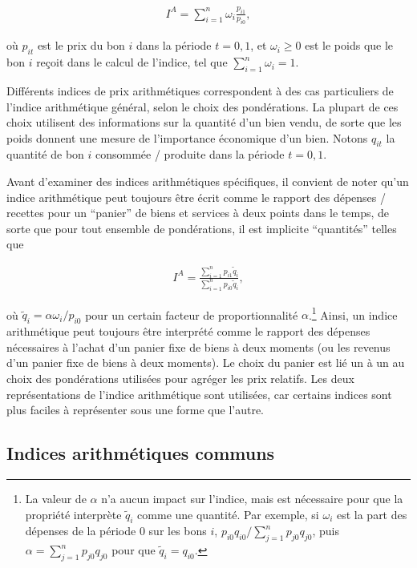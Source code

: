 \documentclass[
]{article}
\begin{document}
\begin{align*}
I^{A} = \sum_{i = 1}^{n} \omega_{i} \frac{p_{i1}}{p_{i0}},
\end{align*}

où \(p_{it}\) est le prix du bon \(i\) dans la période \(t = 0,1\), et \(\omega_{i} \geq 0\) est le poids que le bon \(i\) reçoit dans le calcul de l'indice, tel que \(\sum_{i = 1}^{n} \omega_{i} = 1\).

Différents indices de prix arithmétiques correspondent à des cas particuliers de l'indice arithmétique général, selon le choix des pondérations. La plupart de ces choix utilisent des informations sur la quantité d'un bien vendu, de sorte que les poids donnent une mesure de l'importance économique d'un bien. Notons \(q_{it}\) la quantité de bon \(i\) consommée / produite dans la période \(t = 0,1\).

Avant d'examiner des indices arithmétiques spécifiques, il convient de noter qu'un indice arithmétique peut toujours être écrit comme le rapport des dépenses / recettes pour un ``panier'' de biens et services à deux points dans le temps, de sorte que pour tout ensemble de pondérations, il est implicite ``quantités'' telles que

\begin{align*}
I^{A} = \frac{\sum_{i = 1}^{n} p_{i1} \tilde{q}_{i}}{\sum_{i = 1}^{n} p_{i0} \tilde{q}_{i}},
\end{align*}

où \(\tilde{q}_{i} = \alpha \omega_{i} / p_{i0}\) pour un certain facteur de proportionnalité \(\alpha\).\footnote{La valeur de \(\alpha\) n'a aucun impact sur l'indice, mais est nécessaire pour que la propriété interprète \(\tilde{q}_{i}\) comme une quantité. Par exemple, si \(\omega_{i}\) est la part des dépenses de la période 0 sur les bons \(i\), \(p_{i0} q_{i0} / \sum_{j = 1}^{n} p_{j0} q_{j0}\), puis \(\alpha = \sum_{j = 1}^{n} p_{j0} q_{j0}\) pour que \(\tilde{q}_{i} = q_{i0}\).} Ainsi, un indice arithmétique peut toujours être interprété comme le rapport des dépenses nécessaires à l'achat d'un panier fixe de biens à deux moments (ou les revenus d'un panier fixe de biens à deux moments). Le choix du panier est lié un à un au choix des pondérations utilisées pour agréger les prix relatifs. Les deux représentations de l'indice arithmétique sont utilisées, car certains indices sont plus faciles à représenter sous une forme que l'autre.

\hypertarget{indices-arithmuxe9tiques-communs}{%
\subsection{Indices arithmétiques communs}\label{indices-arithmuxe9tiques-communs}}
\end{document}
